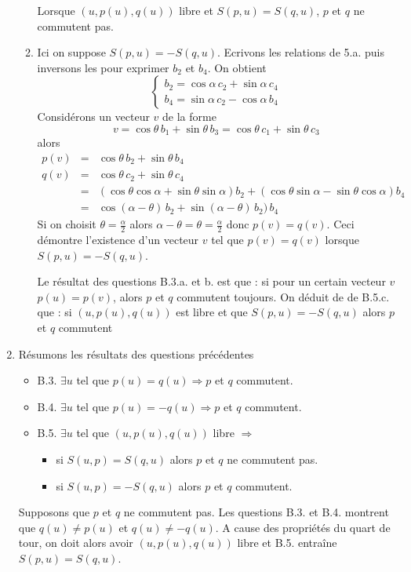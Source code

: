 \begin{enumerate}
\begin{enumerate}
Lorsque $(u,p(u),q(u))$ libre et $S(p,u)=S(q,u)$, $p$ et $q$ ne commutent pas.
\item Ici on suppose $S(p,u)=-S(q,u)$. Ecrivons les relations de 5.a. puis inversons les pour exprimer $b_{2}$ et $b_{4}$. On obtient
\[\left \{ \begin{array}{c} 
b_{2}=\cos \alpha \,c_{2} + \sin\alpha \,c_{4} \\
b_{4}=\sin \alpha \,c_{2} - \cos\alpha \,b_{4} \end{array}\right.\]
Considérons un vecteur $v$ de la forme
\[v=\cos\theta\,b_{1}+\sin\theta\,b_{3}=\cos\theta\,c_{1}+\sin\theta\,c_{3}\]
alors
\begin{eqnarray*}
p(v)&=& \cos\theta\,b_{2}+\sin\theta\,b_{4}\\
q(v)&=& \cos\theta\,c_{2}+\sin\theta\,c_{4}\\
&=&(\cos\theta\cos\alpha+\sin\theta\sin\alpha)b_{2}+(\cos\theta\sin\alpha-\sin\theta\cos\alpha)b_{4}\\
&=&\cos(\alpha-\theta)\,b_{2}+\sin(\alpha-\theta)\,b_{2})\,b_{4}
\end{eqnarray*}
Si on choisit $\theta=\frac{\alpha}{2}$ alors $\alpha-\theta=\theta=\frac{\alpha}{2}$ donc $p(v)=q(v)$. Ceci démontre l'existence d'un vecteur $v$ tel que $p(v)=q(v)$ lorsque $S(p,u)=-S(q,u)$.

Le résultat des questions B.3.a. et b. est que : si pour un certain vecteur $v$ $p(u)=p(v)$, alors $p$ et $q$ commutent toujours. On déduit de de B.5.c. que : si $(u,p(u),q(u))$ est libre et que $S(p,u)=-S(q,u)$ alors $p$ et $q$ commutent
\end{enumerate}
\item Résumons les résultats des questions précédentes
\begin{itemize}
\item B.3. $\exists u$ tel que $p(u)=q(u)\Rightarrow p$ et $q$ commutent.
\item B.4. $\exists u$ tel que $p(u)=-q(u)\Rightarrow p$ et $q$ commutent.
\item B.5. $\exists u$ tel que $(u,p(u),q(u))$ libre $\Rightarrow$
\begin{itemize}
\item si $S(u,p)=S(q,u)$ alors $p$ et $q$ ne commutent pas. 
\item si $S(u,p)=-S(q,u)$ alors $p$ et $q$ commutent.
\end{itemize}
\end{itemize}
Supposons que $p$ et $q$ ne commutent pas. Les questions B.3. et B.4. montrent que $q(u)\neq p(u)$ et $q(u)\neq -q(u)$. A cause des propriétés du quart de tour, on doit alors avoir $(u,p(u),q(u))$ libre et B.5. entraîne $S(p,u)=S(q,u)$.


\end{enumerate}
